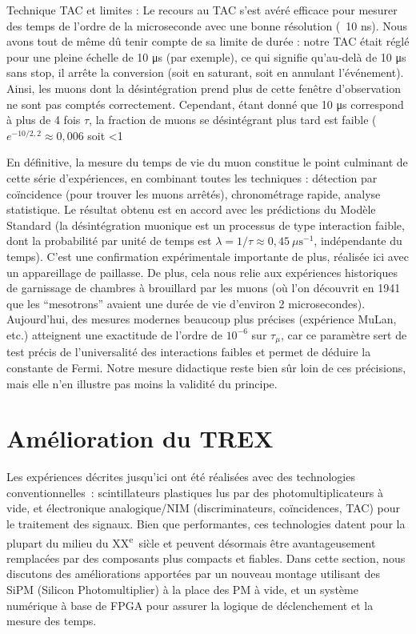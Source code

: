 \documentclass[a4paper,12pt,twoside]{article}
\begin{document}
Technique TAC et limites : Le recours au TAC s’est avéré efficace pour mesurer des temps de l’ordre de la microseconde avec une bonne résolution (~10 ns). Nous avons tout de même dû tenir compte de sa limite de durée : notre TAC était réglé pour une pleine échelle de  10 μs (par exemple), ce qui signifie qu’au-delà de 10 μs sans stop, il arrête la conversion (soit en saturant, soit en annulant l’événement). Ainsi, les muons dont la désintégration prend plus de cette fenêtre d’observation ne sont pas comptés correctement. Cependant, étant donné que 10 μs correspond à plus de 4 fois $\tau$, la fraction de muons se désintégrant plus tard est faible ($e^{-10/2,2} \approx 0,006$ soit <1%

En définitive, la mesure du temps de vie du muon constitue le point culminant de cette série d’expériences, en combinant toutes les techniques : détection par coïncidence (pour trouver les muons arrêtés), chronométrage rapide, analyse statistique. Le résultat obtenu est en accord avec les prédictions du Modèle Standard (la désintégration muonique est un processus de type interaction faible, dont la probabilité par unité de temps est $\lambda = 1/\tau \approx 0,45~\mu\text{s}^{-1}$, indépendante du temps). C’est une confirmation expérimentale importante de plus, réalisée ici avec un appareillage de paillasse. De plus, cela nous relie aux expériences historiques de garnissage de chambres à brouillard par les muons (où l’on découvrit en 1941 que les “mesotrons” avaient une durée de vie d’environ 2 microsecondes). Aujourd’hui, des mesures modernes beaucoup plus précises (expérience MuLan, etc.) atteignent une exactitude de l’ordre de $10^{-6}$ sur $\tau_\mu$, car ce paramètre sert de test précis de l’universalité des interactions faibles et permet de déduire la constante de Fermi. Notre mesure didactique reste bien sûr loin de ces précisions, mais elle n’en illustre pas moins la validité du principe.

\section{Amélioration du TREX}
Les exp\'eriences d\'ecrites jusqu'ici ont \'et\'e r\'ealis\'ees avec des technologies conventionnelles~: scintillateurs plastiques lus par des photomultiplicateurs \`a vide, et \'electronique analogique/NIM (discriminateurs, co\"incidences, TAC) pour le traitement des signaux. Bien que performantes, ces technologies datent pour la plupart du milieu du XX\textsuperscript{e}~si\`cle et peuvent d\'esormais \^etre avantageusement remplac\'ees par des composants plus compacts et fiables. Dans cette section, nous discutons des am\'eliorations apport\'ees par un nouveau montage utilisant des SiPM (Silicon Photomultiplier) \`a la place des PM \`a vide, et un syst\`eme num\'erique \`a base de FPGA pour assurer la logique de d\'eclenchement et la mesure des temps.
\end{document}
